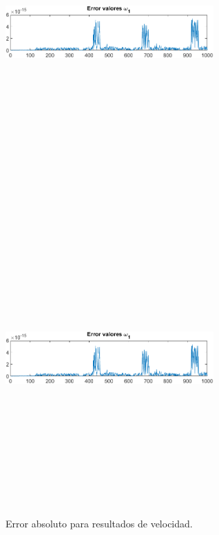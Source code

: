 \documentclass[12pt]{article}
\begin{document}
\begin{multicols}{2}
\begin{figure} [H]
    \end{figure}
    \vspace{-25pt}
        \begin{figure} [H]
        \centerline{\includegraphics[width=8cm, height=12cm,keepaspectratio]{Error/Error omega1.png}}
    \end{figure}
        \vspace{-25pt}
        \begin{figure} [H]
        \centerline{\includegraphics[width=8cm, height=12cm,keepaspectratio]{Error/Error omega1.png}}
        \caption{Error absoluto para resultados de velocidad.}
        \label{}
    \end{figure}
\end{multicols}
\end{document}
